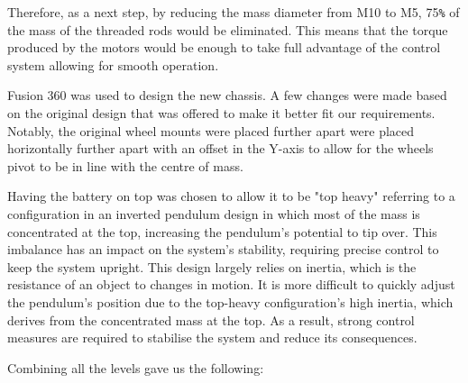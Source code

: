 Therefore, as a next step, by reducing the mass diameter from M10 to M5, 75\verb|%| of the mass of the threaded rods would be eliminated. This means that the torque produced by the motors would be enough to take full advantage of the control system allowing for smooth operation. 

Fusion 360 was used to design the new chassis. A few changes were made based on the original design that was offered to make it better fit our requirements. Notably, the original wheel mounts were placed further apart were placed horizontally further apart with an offset in the Y-axis to allow for the wheels pivot to be in line with the centre of mass. 

Having the battery on top was chosen to allow it to be "top heavy" referring to a configuration in an inverted pendulum design in which most of the mass is concentrated at the top, increasing the pendulum's potential to tip over. This imbalance has an impact on the system's stability, requiring precise control to keep the system upright. This design largely relies on inertia, which is the resistance of an object to changes in motion. It is more difficult to quickly adjust the pendulum's position due to the top-heavy configuration's high inertia, which derives from the concentrated mass at the top. As a result, strong control measures are required to stabilise the system and reduce its consequences.

Combining all the levels gave us the following:

